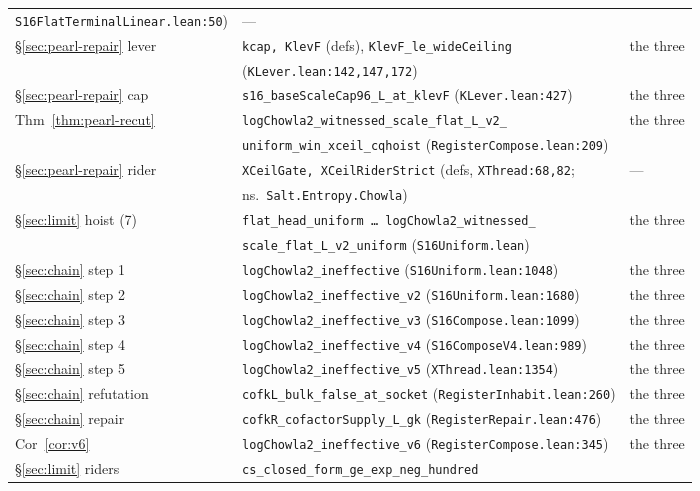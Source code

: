 \documentclass[11pt]{amsart}
\newcommand{\leaninline}[1]{{\small\texttt{#1}}}
\theoremstyle{remark}
\begin{document}
\begin{table}[h]
\begin{tabular}{lll}
  \texttt{S16FlatTerminalLinear.lean:50}) & --- \\
\S\ref{sec:pearl-repair} lever & \leaninline{kcap, KlevF} (defs),
  \leaninline{KlevF\_le\_wideCeiling} & the three \\
 & (\texttt{KLever.lean:142,147,172}) & \\
\S\ref{sec:pearl-repair} cap & \leaninline{s16\_baseScaleCap96\_L\_at\_klevF}
  (\texttt{KLever.lean:427}) & the three \\
Thm~\ref{thm:pearl-recut} &
  \leaninline{logChowla2\_witnessed\_scale\_flat\_L\_v2\_} & the three \\
 & \leaninline{uniform\_win\_xceil\_cqhoist}
  (\texttt{RegisterCompose.lean:209}) & \\
\S\ref{sec:pearl-repair} rider & \leaninline{XCeilGate, XCeilRiderStrict}
  (defs, \texttt{XThread:68,82}; & --- \\
 & ns.\ \leaninline{Salt.Entropy.Chowla}) & \\
\S\ref{sec:limit} hoist (7) &
  \leaninline{flat\_head\_uniform \ldots
  logChowla2\_witnessed\_} & the three \\
 & \leaninline{scale\_flat\_L\_v2\_uniform} (\texttt{S16Uniform.lean}) & \\
\S\ref{sec:chain} step 1 & \leaninline{logChowla2\_ineffective}
  (\texttt{S16Uniform.lean:1048}) & the three \\
\S\ref{sec:chain} step 2 & \leaninline{logChowla2\_ineffective\_v2}
  (\texttt{S16Uniform.lean:1680}) & the three \\
\S\ref{sec:chain} step 3 & \leaninline{logChowla2\_ineffective\_v3}
  (\texttt{S16Compose.lean:1099}) & the three \\
\S\ref{sec:chain} step 4 & \leaninline{logChowla2\_ineffective\_v4}
  (\texttt{S16ComposeV4.lean:989}) & the three \\
\S\ref{sec:chain} step 5 & \leaninline{logChowla2\_ineffective\_v5}
  (\texttt{XThread.lean:1354}) & the three \\
\S\ref{sec:chain} refutation & \leaninline{cofkL\_bulk\_false\_at\_socket}
  (\texttt{RegisterInhabit.lean:260}) & the three \\
\S\ref{sec:chain} repair & \leaninline{cofkR\_cofactorSupply\_L\_gk}
  (\texttt{RegisterRepair.lean:476}) & the three \\
Cor~\ref{cor:v6} & \leaninline{logChowla2\_ineffective\_v6}
  (\texttt{RegisterCompose.lean:345}) & the three \\
\S\ref{sec:limit} riders & \leaninline{cs\_closed\_form\_ge\_exp\_neg\_hundred}

\end{tabular}
\end{table}
\end{document}
